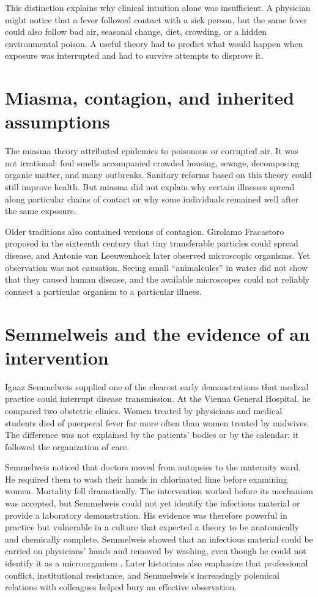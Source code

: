 \documentclass[12pt,oneside]{book}
\begin{document}
This distinction explains why clinical intuition alone was insufficient. A
physician might notice that a fever followed contact with a sick person, but the
same fever could also follow bad air, seasonal change, diet, crowding, or a
hidden environmental poison. A useful theory had to predict what would happen
when exposure was interrupted and had to survive attempts to disprove it.

\section{Miasma, contagion, and inherited assumptions}
The miasma theory attributed epidemics to poisonous or corrupted air. It was
not irrational: foul smells accompanied crowded housing, sewage, decomposing
organic matter, and many outbreaks. Sanitary reforms based on this theory could
still improve health. But miasma did not explain why certain illnesses spread
along particular chains of contact or why some individuals remained well after
the same exposure.

Older traditions also contained versions of contagion. Girolamo Fracastoro
proposed in the sixteenth century that tiny transferable particles could spread
disease, and Antonie van Leeuwenhoek later observed microscopic organisms. Yet
observation was not causation. Seeing small ``animalcules'' in water did not
show that they caused human disease, and the available microscopes could not
reliably connect a particular organism to a particular illness.

\section{Semmelweis and the evidence of an intervention}
Ignaz Semmelweis supplied one of the clearest early demonstrations that medical
practice could interrupt disease transmission. At the Vienna General Hospital,
he compared two obstetric clinics. Women treated by physicians and medical
students died of puerperal fever far more often than women treated by midwives.
The difference was not explained by the patients' bodies or by the calendar; it
followed the organization of care.

Semmelweis noticed that doctors moved from autopsies to the maternity ward. He
required them to wash their hands in chlorinated lime before examining women.
Mortality fell dramatically. The intervention worked before its mechanism was
accepted, but Semmelweis could not yet identify the infectious material or
provide a laboratory demonstration. His evidence was therefore powerful in
practice but vulnerable in a culture that expected a theory to be anatomically
and chemically complete. Semmelweis showed that an infectious material could be
carried on physicians' hands and removed by washing, even though he could not
identify it as a microorganism \cite{sciencehistorysemmelweis}. Later historians
also emphasize that professional
conflict, institutional resistance, and Semmelweis's increasingly polemical
relations with colleagues helped bury an effective observation.
\end{document}
